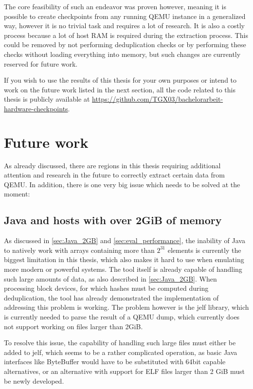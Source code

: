 The core feasibility of such an endeavor was proven however,
meaning it is possible to create checkpoints from any running QEMU instance in a generalized way,
however it is no trivial task and requires a lot of research.
It is also a costly process because a lot of host RAM is required during the extraction process.
This could be removed by not performing deduplication checks
or by performing these checks without loading everything into memory,
but such changes are currently reserved for future work.

If you wish to use the results of this thesis for your own purposes
or intend to work on the future work listed in the next section,
all the code related to this thesis is publicly available at \url{https://github.com/TGX03/bachelorarbeit-hardware-checkpoints}.

\section{Future work}
As already discussed, there are regions in this thesis requiring additional attention and research in the future to correctly extract certain data from QEMU.
In addition, there is one very big issue which needs to be solved at the moment:

\subsection{Java and hosts with over 2GiB of memory}
As discussed in \autoref{sec:Java_2GB} and \autoref{sec:eval_performance},
the inability of Java to natively work with arrays containing more than $2^{31}$ elements
is currently the biggest limitation in this thesis,
which also makes it hard to use when emulating more modern or powerful systems.
The tool itself is already capable of handling such large amounts of data, as also described in \autoref{sec:Java_2GB}.
When processing block devices, for which hashes must be computed during deduplication,
the tool has already demonstrated the implementation of addressing this problem is working.
The problem however is the jelf library, which is currently needed to parse the result of a QEMU dump,
which currently does not support working on files larger than 2GiB.

To resolve this issue, the capability of handling such large files must either be added to jelf,
which seems to be a rather complicated operation,
as basic Java interfaces like ByteBuffer would have to be substituted with 64bit capable alternatives,
or an alternative with support for ELF files larger than 2 GiB must be newly developed.

